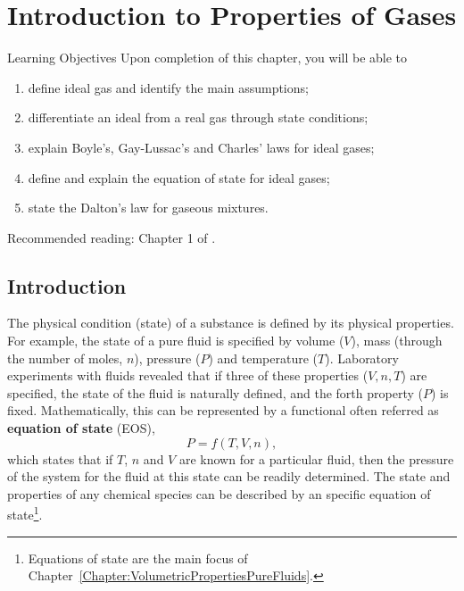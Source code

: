 
\chapter{Introduction to Properties of Gases}\label{Chapter:Intro_Property_of_Gases}

   \begin{LearningObjectivesBlock}{Learning Objectives}
      Upon completion of this chapter, you will be able to
        \begin{enumerate}
           \item define ideal gas and identify the main assumptions;
           \item differentiate an ideal from a real gas through state conditions;
           \item explain Boyle's, Gay-Lussac's and Charles' laws for ideal gases;
           \item define and explain the equation of state for ideal gases;
           \item state the Dalton's law for gaseous mixtures.
        \end{enumerate}
\medskip
     Recommended reading: Chapter 1 of \citet{Atkins_Book,Adamson_BookChapter}.
   \end{LearningObjectivesBlock}

   
     \section{Introduction}\label{Chapter:Intro_Property_of_Gases:Section:Intro}

   The physical condition (\ie state) of a substance is defined by its physical properties. For example, the state of a pure fluid is specified by volume ($V$), mass (through the number of moles, $n$), pressure ($P$) and temperature ($T$). Laboratory experiments with fluids revealed that if three of these properties (\eg $V, n, T$) are specified, the state of the fluid is naturally defined, and the forth property (\ie $P$) is fixed. Mathematically, this can be represented by a functional often referred as {\bf equation of state} (EOS),
     \begin{displaymath}
       P = f(T,V,n),
     \end{displaymath}
     which states that if $T$, $n$ and $V$ are known for a particular fluid, then the pressure of the system for the fluid at this state can be readily determined. The state and properties of any chemical species can be described by an specific equation of state\footnote{Equations of state are the main focus of Chapter~\ref{Chapter:VolumetricPropertiesPureFluids}.}.
   
